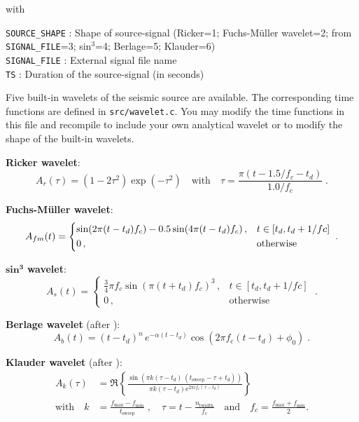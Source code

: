 with

\texttt{SOURCE\_SHAPE} : Shape of source-signal (Ricker=1; Fuchs-M\"uller wavelet=2; from \texttt{SIGNAL\_FILE}=3; sin$^3$=4; Berlage=5; Klauder=6)\\
\texttt{SIGNAL\_FILE} : External signal file name\\
\texttt{TS} : Duration of the source-signal (in seconds)

Five built-in wavelets of the seismic source are available. The corresponding time functions are defined in \texttt{src/wavelet.c}. You may modify the time functions in this file and recompile to include your own analytical wavelet or to modify the shape of the built-in wavelets.

\textbf{Ricker wavelet}:
\begin{equation}
    A_r(\tau)= \left(1-2\tau^2\right)\exp(- \tau^2) \quad \mbox{with} \quad \tau=\frac{\pi(t-1.5/f_c-t_d)}{1.0/f_c}\;. 
    \label{eq_ricker}
\end{equation}

\textbf{Fuchs-M\"uller wavelet}:
\begin{equation}
    A_{fm}(t) = \begin{dcases} \sin(2\pi(t-t_d)f_c)-0.5\sin(4\pi(t-t_d)f_c)\,, & t\in[t_d,t_d+1/fc] \\
                 0\,, & \text{otherwise} \end{dcases}\;.
    \label{eq_fm}
\end{equation}

$\mathbf{sin^3}$ \textbf{wavelet}:
\begin{equation}
    A_{s}(t)=\begin{cases} \frac{3}{4} \pi f_c \sin(\pi(t+t_d)f_c)^3\,, & t \in[t_d,t_d+1/fc]\\
           0\,, & \text{otherwise} \end{cases}\;.
\label{eq_s3}
\end{equation}

\textbf{Berlage wavelet} (after \cite{aldrige:90}):
\begin{equation}
    A_b(t)=(t-t_d)^n\,e^{-\alpha (t-t_d)} \cos(2 \pi f_c (t-t_d) + \phi_0)\;.
    \label{eq_berlage}
\end{equation}

\textbf{Klauder wavelet} (after \cite{neelima:18}):
\begin{equation}
\begin{split} A_k(\tau) &= \Re \left\{ \frac{\sin\left(\pi k(\tau-t_d)\,(t_\text{sweep}-\tau+t_d)\right)}{ \pi k (\tau-t_d) e^{2 \pi i f_c (\tau-t_d)} } \right\} \\
\mbox{with} \quad k &= \frac{f_\text{max}-f_\text{min}}{t_\text{sweep}}\;,\quad\tau = t-\frac{n_\text{twidth}}{f_c}\quad\text{and}\quad f_c=\frac{f_\text{max}+f_\text{min}}{2}.\end{split}
    \label{eq_klauder}
\end{equation}

